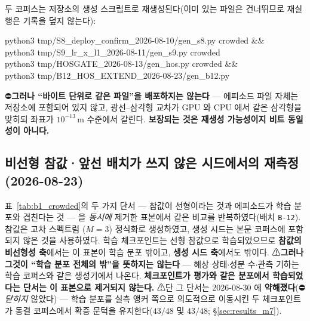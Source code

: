 \documentclass[11pt]{report}
\numberwithin{equation}{chapter}
\numberwithin{figure}{chapter}
\numberwithin{table}{chapter}
\begin{document}
두 코퍼스는 저장소의 생성 스크립트로 재생성된다(이미 있는 파일은 건너뛰므로 재실행은
기록을 덮지 않는다):
\begin{flushleft}\footnotesize\ttfamily\noindent
python3 tmp/S8\_deploy\_confirm\_2026-08-10/gen\_s8.py crowded \&\& \\
python3 tmp/S9\_lr\_x\_l1\_2026-08-11/gen\_s9.py crowded \\[5pt]
python3 tmp/HOSGATE\_2026-08-13/gen\_hos.py crowded \&\& \\
python3 tmp/B12\_HOS\_EXTEND\_2026-08-23/gen\_b12.py
\end{flushleft}
⛔\textbf{그러나 ``바이트 단위로 같은 파일''을 배포하지는 않는다} --- 에피소드 파일 자체는
저장소에 포함되어 있지 않고, 광선--삼각형 교차가 GPU 와 CPU 에서 같은 삼각형을 맞히되
좌표가 $10^{-13}$\,m 수준에서 갈린다. \textbf{보장되는 것은 재생성 가능성이지 비트
동일성이 아니다.}

\subsection{비선형 참값·앞선 배치가 쓰지 않은 시드에서의 재측정 (2026-08-23)}
\label{sec:results_b11}


표~\ref{tab:b1_crowded}의 두 가지 단서 --- 참값이 선형이라는 것과 에피소드가 학습 분포와
겹친다는 것 --- 을 \emph{동시에} 제거한 표본에서 같은 비교를 반복하였다(배치 \texttt{B-12}).
참값은 고차 스펙트럼
($M{=}3$) 정식화로 생성하였고, 생성 시드는 본문 코퍼스에 포함되지 않은 것을 사용하였다.
학습 체크포인트는 선형 참값으로 학습되었으므로 \textbf{참값의 비선형성 축}에서는 이 표본이
학습 분포 밖이고, \textbf{생성 시드 축}에서도 밖이다. ⚠\textbf{그러나 그것이
``학습 분포 전체의 밖''을 뜻하지는 않는다} --- 해상 상태$\cdot$성분 수$\cdot$관측 기하는
학습 코퍼스와 같은 생성기에서 나온다. \textbf{체크포인트가 평가와 같은 분포에서 학습되었다는
단서는 이 표본으로 제거되지 않는다.}
⚠단 그 단서는 2026-08-30 에 \textbf{약해졌다}(⛔\emph{닫히지} 않았다) --- 학습 분포를
실측 앵커 쪽으로 의도적으로 이동시킨 두 체크포인트가 동결 코퍼스에서 확증 문턱을
유지한다($43/48$ 및 $43/48$; \S\ref{sec:results_m7}).
\end{document}
